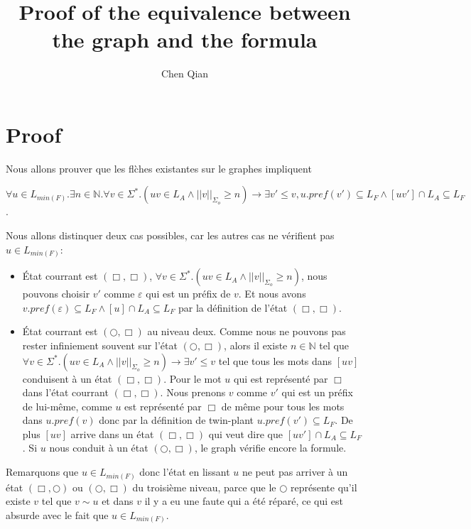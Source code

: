 \documentclass[a4paper,10pt]{article}
\title{Proof of the equivalence between the graph and the formula}
\author{Chen Qian}
\begin{document}
\maketitle

\section{Proof}

Nous allons prouver que les fl\`ches existantes sur le graphes impliquent

$$\forall u \in L_{min(F)}. \exists n \in \mathbb{N}. \forall v \in \Sigma^*.(uv \in L_A \wedge ||v||_{\Sigma_o}\geq n) \to \exists v'\leq v, u.pref(v') \subseteq L_F \wedge [uv'] \cap L_A \subseteq L_F$$.

Nous allons distinquer deux cas possibles, car les autres cas ne v\'erifient pas $u \in L_{min(F)}$:
\begin{itemize}
\item \'Etat courrant est $(\Box, \Box)$, $\forall v \in \Sigma^*.(uv \in L_A \wedge ||v||_{\Sigma_o}\geq n)$, nous pouvons choisir $v'$ comme $\varepsilon$ qui est un pr\'efix de $v$. Et nous avons $v.pref(\varepsilon) \subseteq L_F \wedge [u] \cap L_A \subseteq L_F$ par la d\'efinition de l'\'etat $(\Box, \Box)$.
\item \'Etat courrant est $(\bigcirc,\Box)$ au niveau deux. Comme nous ne pouvons pas rester infiniement souvent sur l'\'etat $(\bigcirc,\Box)$, alors il existe $n \in \mathbb{N}$ tel que $ \forall v \in \Sigma^*.(uv \in L_A \wedge ||v||_{\Sigma_o}\geq n) \to \exists v'\leq v$ tel que tous les mots dans $[uv]$ conduisent \`a un \'etat $(\Box,\Box)$. Pour le mot $u$ qui est repr\'esent\'e par $\Box$ dans l'\'etat courrant $(\Box,\Box)$. Nous prenons $v$ comme $v'$ qui est un pr\'efix de lui-m\^eme, comme $u$ est repr\'esent\'e par $\Box$ de m\^eme pour tous les mots dans $u.pref(v)$ donc par la d\'efinition de twin-plant $u.pref(v') \subseteq L_F$. De plus $[uv]$ arrive dans un \'etat $(\Box,\Box)$ qui veut dire que $[uv'] \cap L_A \subseteq L_F$. Si $u$ nous conduit \`a un \'etat $(\bigcirc,\Box)$, le graph v\'erifie encore la formule.
\end{itemize}

Remarquons que $u\in L_{min(F)}$ donc l'\'etat en lissant $u$ ne peut pas arriver \`a un \'etat $(\Box,\bigcirc)$ ou $(\bigcirc,\Box)$ du troisi\`eme niveau, parce que le $\bigcirc$ repr\'esente qu'il existe $v$ tel que $v \sim u$ et dans $v$ il y a eu une faute qui a \'et\'e r\'epar\'e, ce qui est absurde avec le fait que $u \in L_{min(F)}$.
\end{document}
